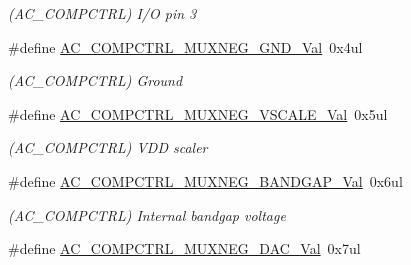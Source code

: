 \begin{DoxyCompactItemize}
\begin{DoxyCompactList}\small\item\em (A\+C\+\_\+\+C\+O\+M\+P\+C\+T\+R\+L) I/\+O pin 3 \end{DoxyCompactList}\item 
\hypertarget{group___s_a_m_l21___a_c_ga04da0d95ff4ac4513cfca85f607ca882}{}\#define \hyperlink{group___s_a_m_l21___a_c_ga04da0d95ff4ac4513cfca85f607ca882}{A\+C\+\_\+\+C\+O\+M\+P\+C\+T\+R\+L\+\_\+\+M\+U\+X\+N\+E\+G\+\_\+\+G\+N\+D\+\_\+\+Val}~0x4ul\label{group___s_a_m_l21___a_c_ga04da0d95ff4ac4513cfca85f607ca882}

\begin{DoxyCompactList}\small\item\em (A\+C\+\_\+\+C\+O\+M\+P\+C\+T\+R\+L) Ground \end{DoxyCompactList}\item 
\hypertarget{group___s_a_m_l21___a_c_ga6c73eec576197476fa0e9ed08bfe24a2}{}\#define \hyperlink{group___s_a_m_l21___a_c_ga6c73eec576197476fa0e9ed08bfe24a2}{A\+C\+\_\+\+C\+O\+M\+P\+C\+T\+R\+L\+\_\+\+M\+U\+X\+N\+E\+G\+\_\+\+V\+S\+C\+A\+L\+E\+\_\+\+Val}~0x5ul\label{group___s_a_m_l21___a_c_ga6c73eec576197476fa0e9ed08bfe24a2}

\begin{DoxyCompactList}\small\item\em (A\+C\+\_\+\+C\+O\+M\+P\+C\+T\+R\+L) V\+D\+D scaler \end{DoxyCompactList}\item 
\hypertarget{group___s_a_m_l21___a_c_gacef3eff54dde36e480ae03d0812de305}{}\#define \hyperlink{group___s_a_m_l21___a_c_gacef3eff54dde36e480ae03d0812de305}{A\+C\+\_\+\+C\+O\+M\+P\+C\+T\+R\+L\+\_\+\+M\+U\+X\+N\+E\+G\+\_\+\+B\+A\+N\+D\+G\+A\+P\+\_\+\+Val}~0x6ul\label{group___s_a_m_l21___a_c_gacef3eff54dde36e480ae03d0812de305}

\begin{DoxyCompactList}\small\item\em (A\+C\+\_\+\+C\+O\+M\+P\+C\+T\+R\+L) Internal bandgap voltage \end{DoxyCompactList}\item 
\hypertarget{group___s_a_m_l21___a_c_ga8e6a3e15110f0de0d04e4f3d91025027}{}\#define \hyperlink{group___s_a_m_l21___a_c_ga8e6a3e15110f0de0d04e4f3d91025027}{A\+C\+\_\+\+C\+O\+M\+P\+C\+T\+R\+L\+\_\+\+M\+U\+X\+N\+E\+G\+\_\+\+D\+A\+C\+\_\+\+Val}~0x7ul\label{group___s_a_m_l21___a_c_ga8e6a3e15110f0de0d04e4f3d91025027}


\end{DoxyCompactItemize}
